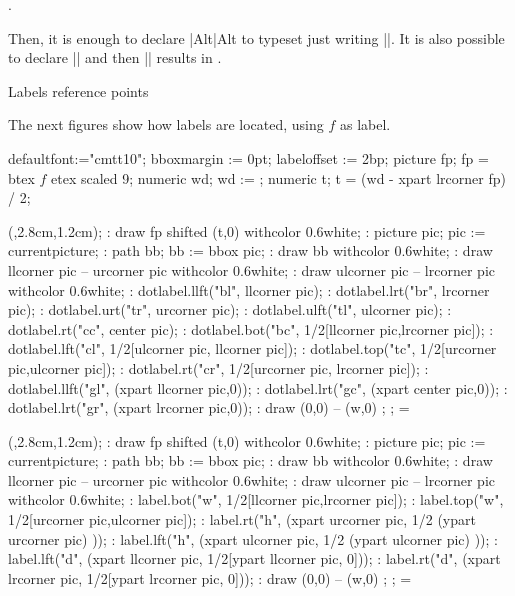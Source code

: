 \def\makekey#1{\expandafter\defkey\csname#1\endcsname{#1}}
.

\beginlisting
{}
\endlisting


Then, it is enough to declare |\makekey{Alt}|\makekey{Alt} to
typeset {\Alt} just writing |\Alt|.  It is also possible to
declare || 
and then |\escape| results in \escape.


\beginsection Labels reference points

The next figures show how labels are located,
using $f$ as label.

\newdimen\wid \dimen\wid=3cm

\MTcode
defaultfont:="cmtt10";
bboxmargin := 0pt; labeloffset := 2bp;
picture fp; fp = btex $f$ etex scaled 9;
numeric wd; wd := \the\dimen\wid;
numeric t; t = (wd - xpart lrcorner fp) / 2;

\MTline{}

\MTbeginchar(\the\dimen\wid,2.8cm,1.2cm);
\MT: draw fp shifted (t,0) withcolor 0.6white;
\MT: picture pic; pic := currentpicture;
\MT: path bb; bb := bbox pic;
\MT: draw bb withcolor 0.6white;
\MT: draw llcorner pic -- urcorner pic withcolor 0.6white;
\MT: draw ulcorner pic -- lrcorner pic withcolor 0.6white;
\MT: dotlabel.llft("bl", llcorner pic);
\MT: dotlabel.lrt("br",  lrcorner pic);
\MT: dotlabel.urt("tr", urcorner pic);
\MT: dotlabel.ulft("tl",  ulcorner pic);
\MT: dotlabel.rt("cc", center pic);
\MT: dotlabel.bot("bc", 1/2[llcorner pic,lrcorner pic]);
\MT: dotlabel.lft("cl", 1/2[ulcorner pic, llcorner pic]);
\MT: dotlabel.top("tc", 1/2[urcorner pic,ulcorner pic]);
\MT: dotlabel.rt("cr",  1/2[urcorner pic, lrcorner pic]);
\MT: dotlabel.llft("gl", (xpart llcorner pic,0));
\MT: dotlabel.lrt("gc", (xpart center pic,0));
\MT: dotlabel.lrt("gr", (xpart lrcorner pic,0));
\MT: draw (0,0) -- (w,0) ; %
\MTendchar;
=\box\MTbox

\MTbeginchar(\the\dimen\wid,2.8cm,1.2cm);
\MT: draw fp shifted (t,0) withcolor 0.6white;
\MT: picture pic; pic := currentpicture;
\MT: path bb; bb := bbox pic;
\MT: draw bb withcolor 0.6white;
\MT: draw llcorner pic -- urcorner pic withcolor 0.6white;
\MT: draw ulcorner pic -- lrcorner pic withcolor 0.6white;
\MT: label.bot("w", 1/2[llcorner pic,lrcorner pic]);
\MT: label.top("w", 1/2[urcorner pic,ulcorner pic]);
\MT: label.rt("h", (xpart urcorner pic, 1/2 (ypart urcorner pic) ));
\MT: label.lft("h", (xpart ulcorner pic, 1/2 (ypart ulcorner pic) ));
\MT: label.lft("d", (xpart llcorner pic, 1/2[ypart llcorner pic, 0]));
\MT: label.rt("d", (xpart lrcorner pic,  1/2[ypart lrcorner pic, 0]));
\MT: draw (0,0) -- (w,0) ; %
\MTendchar;
=\box\MTbox


